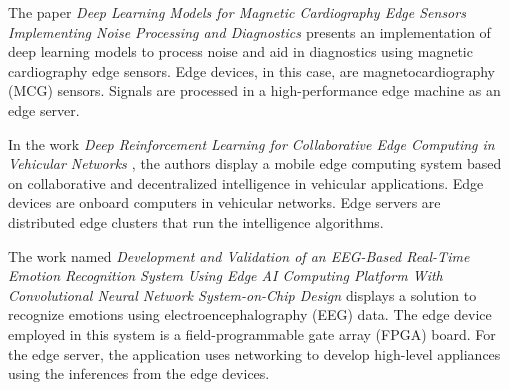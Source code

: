 
The paper \textit{Deep Learning Models for Magnetic Cardiography Edge Sensors Implementing Noise Processing and Diagnostics \cite{sakib2021deep}} presents an implementation of deep learning models to process noise and aid in diagnostics using magnetic cardiography edge sensors. Edge devices, in this case, are magnetocardiography (MCG) sensors. Signals are processed in a high-performance edge machine as an edge server.



In the work \textit{Deep Reinforcement Learning for Collaborative Edge Computing in Vehicular Networks \cite{li2020deep}}, the authors display a mobile edge computing system based on collaborative and decentralized intelligence in vehicular applications. Edge devices are onboard computers in vehicular networks. Edge servers are distributed edge clusters that run the intelligence algorithms.



The work named \textit{Development and Validation of an EEG-Based Real-Time Emotion Recognition System Using Edge AI Computing Platform With Convolutional Neural Network System-on-Chip Design \cite{fang2019development}} displays a solution to recognize emotions using electroencephalography (EEG) data. The edge device employed in this system is a field-programmable gate array (FPGA) board. For the edge server, the application uses networking to develop high-level appliances using the inferences from the edge devices.


